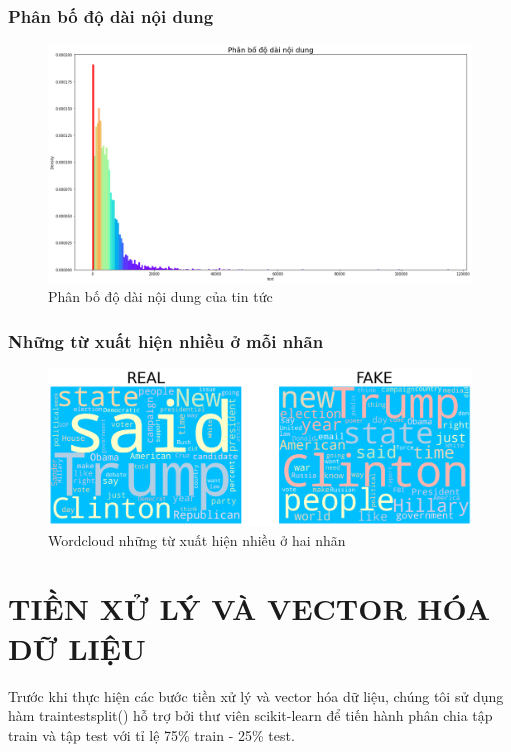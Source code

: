 \documentclass[12pt,a4paper,oneside]{book}
\begin{document}
	\subsection{Phân bố độ dài nội dung}
	
				\begin{figure}[H]
					\begin{center}
						\includegraphics[width=0.9\columnwidth]{textlen}
					\end{center}
					\caption{Phân bố độ dài nội dung của tin tức}
				\end{figure}
				
	\subsection{Những từ xuất hiện nhiều ở mỗi nhãn}
				\begin{figure}[H]
					\begin{center}
						\includegraphics[width=0.9\columnwidth]{wordcloud}
					\end{center}
					\caption{Wordcloud những từ xuất hiện nhiều ở hai nhãn}
				\end{figure}

\chapter{TIỀN XỬ LÝ VÀ VECTOR HÓA DỮ LIỆU}
	
	Trước khi thực hiện các bước tiền xử lý và vector hóa dữ liệu, chúng tôi sử dụng hàm traintestsplit() hỗ trợ bởi thư viên scikit-learn để tiến hành phân chia tập train và tập test với tỉ lệ 75\% train - 25\% test. 
	
\end{document}

